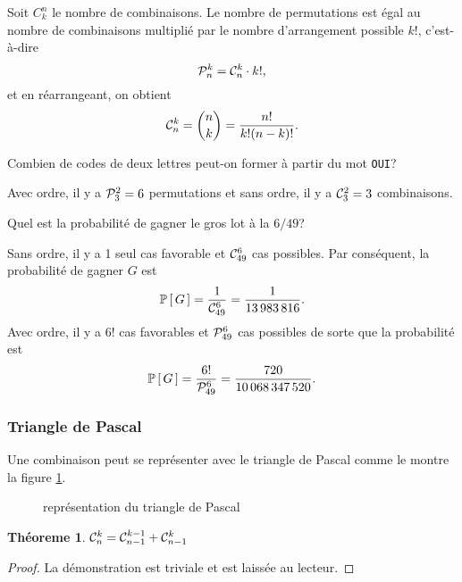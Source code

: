\documentclass[11pt]{article}
\newcommand\comb[2]{%
	\ensuremath{%
		\mathcal{C}_{#2}^{#1}%
	}%
}%
\newcommand\perm[2]{%
	\ensuremath{%
		\mathcal{P}_{#2}^{#1}%
	}%
}%
\renewcommand\P[1]{%
	\ensuremath{%
		\mathbb{P}\left[\,#1\,\right]%
	}%
}%
\newtheorem{theoreme}{Théoreme}[section]
\theoremstyle{remark}
\theoremstyle{definition}
\begin{document}
Soit $C_k^n$ le nombre de combinaisons. Le nombre de permutations est égal au
nombre de combinaisons multiplié par le nombre d'arrangement possible $k!$,
c'est-à-dire 
\begin{equation*}
	\perm{k}{n}=\comb{k}{n}\cdot k!,
\end{equation*}
et en réarrangeant, on obtient
\begin{equation*}
	\comb{k}{n}={{n}\choose{k}}=\frac{n!}{k!(n-k)!}.
\end{equation*}

\begin{exemple}
	Combien de codes de deux lettres peut-on former à partir du mot
	\texttt{OUI}?
	
	Avec ordre, il y a $\perm{2}{3}=6$ permutations et sans ordre, il y a
	$\comb{2}{3}=3$ combinaisons.
\end{exemple}

\begin{exemple}
	Quel est la probabilité de gagner le gros lot à la $6/49$?
	
	Sans ordre, il y a 1 seul cas favorable et $\comb{6}{49}$ cas possibles.
	Par conséquent, la probabilité de gagner $G$ est
	\begin{equation*}
		\P{G}=\frac{1}{\comb{6}{49}}=\frac{1}{\SI{13983816}{}}.
	\end{equation*}
	Avec ordre, il y a $6!$ cas favorables et $\perm{6}{49}$ cas possibles de
	sorte que la probabilité est
	\begin{equation*}
		\P{G}=\frac{6!}{\perm{6}{49}}=\frac{720}{\SI{10068347520}{}}.
	\end{equation*}
\end{exemple}

\subsubsection{Triangle de Pascal}
Une combinaison peut se représenter avec le triangle de Pascal comme le montre
la figure \ref{fig:pascal}.

\begin{figure}[H]
	\centering
	
	\caption{représentation du triangle de Pascal}
	\label{fig:pascal}
\end{figure}

\begin{theoreme}
	$\comb{k}{n}=\comb{k-1}{n-1}+\comb{k}{n-1}$
\end{theoreme}

\begin{proof}
	La démonstration est triviale et est laissée au lecteur.
\end{proof}
\end{document}
